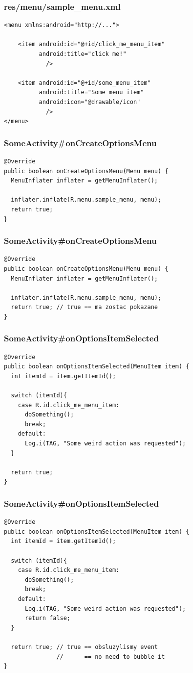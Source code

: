 \documentclass{beamer}
\begin{document}
\begin{frame}[fragile]\frametitle{res/menu/sample\_menu.xml}
\begin{lstlisting}
<menu xmlns:android="http://...">

    <item android:id="@+id/click_me_menu_item"
          android:title="click me!"
            />

    <item android:id="@+id/some_menu_item"
          android:title="Some menu item"
          android:icon="@drawable/icon"
            />
</menu>
\end{lstlisting}
\end{frame}

\begin{frame}[fragile]\frametitle{SomeActivity\#onCreateOptionsMenu}
\begin{lstlisting}
@Override
public boolean onCreateOptionsMenu(Menu menu) { 
  MenuInflater inflater = getMenuInflater();

  inflater.inflate(R.menu.sample_menu, menu);
  return true;
}
\end{lstlisting}
\end{frame}

\begin{frame}[fragile]\frametitle{SomeActivity\#onCreateOptionsMenu}
\begin{lstlisting}
@Override
public boolean onCreateOptionsMenu(Menu menu) { 
  MenuInflater inflater = getMenuInflater();

  inflater.inflate(R.menu.sample_menu, menu);
  return true; // true == ma zostac pokazane
}
\end{lstlisting}
\end{frame}

\begin{frame}[fragile]\frametitle{SomeActivity\#onOptionsItemSelected}
\begin{lstlisting}
@Override
public boolean onOptionsItemSelected(MenuItem item) {
  int itemId = item.getItemId();

  switch (itemId){
    case R.id.click_me_menu_item:
      doSomething();
      break;
    default:
      Log.i(TAG, "Some weird action was requested");
  }

  return true; 
}
\end{lstlisting}
\end{frame}

\begin{frame}[fragile]\frametitle{SomeActivity\#onOptionsItemSelected}
\begin{lstlisting}
@Override
public boolean onOptionsItemSelected(MenuItem item) {
  int itemId = item.getItemId();

  switch (itemId){
    case R.id.click_me_menu_item:
      doSomething();
      break;
    default:
      Log.i(TAG, "Some weird action was requested");
      return false;
  }

  return true; // true == obsluzylismy event
               //      == no need to bubble it
}
\end{lstlisting}
\end{frame}
\end{document}
